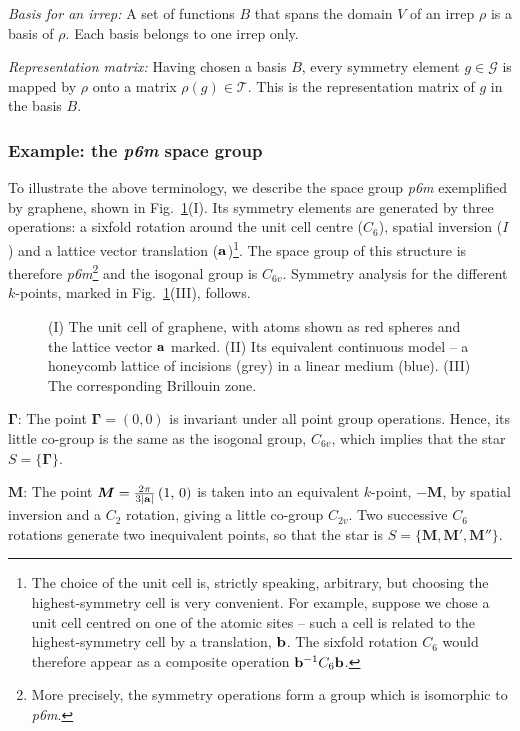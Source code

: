 \textit{Basis for an irrep:} A set of functions $B$ that spans the domain $V$ of an irrep $\rho$ is a basis of $\rho$. Each basis belongs to one irrep only.

\textit{Representation matrix:} Having chosen a basis $B$, every symmetry element $g \in \mathcal{G}$ is mapped by $\rho$ onto a matrix $\rho(g) \in \mathcal{T}$. This is the representation matrix of $g$ in the basis $B$.

\subsubsection{Example: the \textit{p6m} space group}

To illustrate the above terminology, we describe the space group \textit{p6m} exemplified by graphene, shown in Fig.~\ref{fig:symm_graphene}(I). Its symmetry elements are generated by three operations: a sixfold rotation around the unit cell centre ($C_6$), spatial inversion ($I$) and a lattice vector translation ($\vb{a}$)\footnote{The choice of the unit cell is, strictly speaking, arbitrary, but choosing the highest-symmetry cell is very convenient. For example, suppose we chose a unit cell centred on one of the atomic sites -- such a cell is related to the highest-symmetry cell by a translation, $\vb{b}$. The sixfold rotation $C_6$ would therefore appear as a composite operation $\vb{b}^{-1} C_6 \vb{b}$.}. The space group of this structure is therefore \textit{p6m}\footnote{More precisely, the symmetry operations form a group which is isomorphic to \textit{p6m}.} and the isogonal group is $C_{6v}$. Symmetry analysis for the different $k$-points, marked in Fig.~\ref{fig:symm_graphene}(III), follows.

\begin{figure} [h!]
	\centering
	
	\caption{(I) The unit cell of graphene, with atoms shown as red spheres and the lattice vector $\vb{a}$ marked. (II) Its equivalent continuous model -- a honeycomb lattice of incisions (grey) in a linear medium (blue). (III) The corresponding Brillouin zone.}
	\label{fig:symm_graphene}
\end{figure} 

$\boldsymbol{\Gamma}$: The point $\boldsymbol{\Gamma} = (0,0)$ is invariant under all point group operations. Hence, its little co-group is the same as the isogonal group, $C_{6v}$, which implies that the star $S = \{ \boldsymbol{\Gamma} \}$.

$\boldsymbol{M}$: The point $\boldsymbol{M} = \frac{2\pi}{3 \abs{\vb{a}}} \left(1,\,0 \right)$ is taken into an equivalent $k$-point, $-\boldsymbol{M}$, by spatial inversion and a $C_2$ rotation, giving a little co-group $C_{2v}$. Two successive $C_6$ rotations generate two inequivalent points, so that the star is $S = \{ \boldsymbol{M}, \boldsymbol{M}', \boldsymbol{M}'' \}$. 


